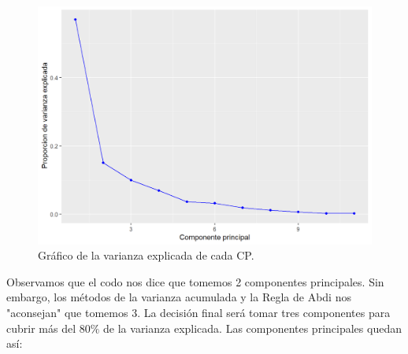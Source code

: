 \begin{figure}[H]
    \centering
    \includegraphics[scale=0.8]{codo.png}
    \caption{Gráfico de la varianza explicada de cada CP.}
\end{figure}

Observamos que el codo nos dice que tomemos 2 componentes principales. Sin embargo, los métodos de la varianza acumulada y la Regla de Abdi nos "aconsejan" que tomemos 3. La decisión final será tomar tres componentes para cubrir más del 80$\%$ de la varianza explicada. Las componentes principales quedan así:

